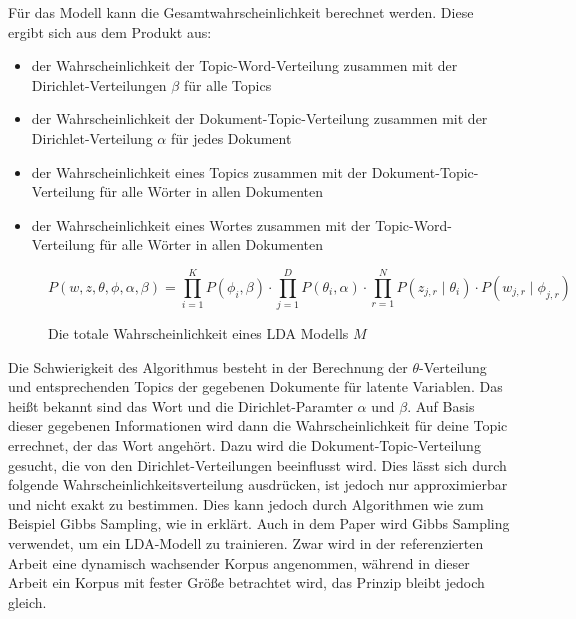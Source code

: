 \documentclass[german,version-2020-11]{uzl-thesis}
\begin{document}
Für das Modell kann die Gesamtwahrscheinlichkeit berechnet werden. Diese ergibt sich aus dem Produkt aus: 
\begin{itemize}
\item der Wahrscheinlichkeit der Topic-Word-Verteilung zusammen mit der Dirichlet-Verteilungen $\beta$ für alle Topics
\item der Wahrscheinlichkeit der Dokument-Topic-Verteilung zusammen mit der Dirichlet-Verteilung $\alpha$ für jedes Dokument
\item der Wahrscheinlichkeit eines Topics zusammen mit der Dokument-Topic-Verteilung für alle Wörter in allen Dokumenten
\item der Wahrscheinlichkeit eines Wortes zusammen mit der Topic-Word-Verteilung für alle Wörter in allen Dokumenten
\end{itemize}

\begin{figure}[h]
\begin{center}
\begin{equation}
P(w,z,\theta, \phi, \alpha, \beta) = \prod_{i=1}^{K} P(\phi_i, \beta) \cdot \prod_{j=1}^{D}P(\theta_i, \alpha) \cdot \prod_{r=1}^{N} P(z_{j,r}\mid\theta_i) \cdot P(w_{j,r} \mid \phi_{j,r}) 
\end{equation}
\end{center}
\caption{Die totale Wahrscheinlichkeit eines LDA Modells $M$}
\label{fig:equ1}
\end{figure}


Die Schwierigkeit des Algorithmus besteht in der Berechnung der $\theta$-Verteilung und entsprechenden Topics der gegebenen Dokumente für latente Variablen. Das heißt bekannt sind das Wort und die Dirichlet-Paramter $\alpha$ und $\beta$. Auf Basis dieser gegebenen Informationen wird dann die Wahrscheinlichkeit für deine Topic errechnet, der das Wort angehört. Dazu wird die Dokument-Topic-Verteilung gesucht, die von den Dirichlet-Verteilungen beeinflusst wird. Dies lässt sich durch folgende Wahrscheinlichkeitsverteilung ausdrücken, ist jedoch nur approximierbar und nicht exakt zu bestimmen. Dies kann jedoch durch Algorithmen wie zum Beispiel Gibbs Sampling, wie in \cite{lda2} erklärt. Auch in dem Paper \cite{magnus} wird Gibbs Sampling verwendet, um ein LDA-Modell zu trainieren. Zwar wird in der referenzierten Arbeit eine dynamisch wachsender Korpus angenommen, während in dieser Arbeit ein Korpus mit fester Größe betrachtet wird, das Prinzip bleibt jedoch gleich. \\
\end{document}
